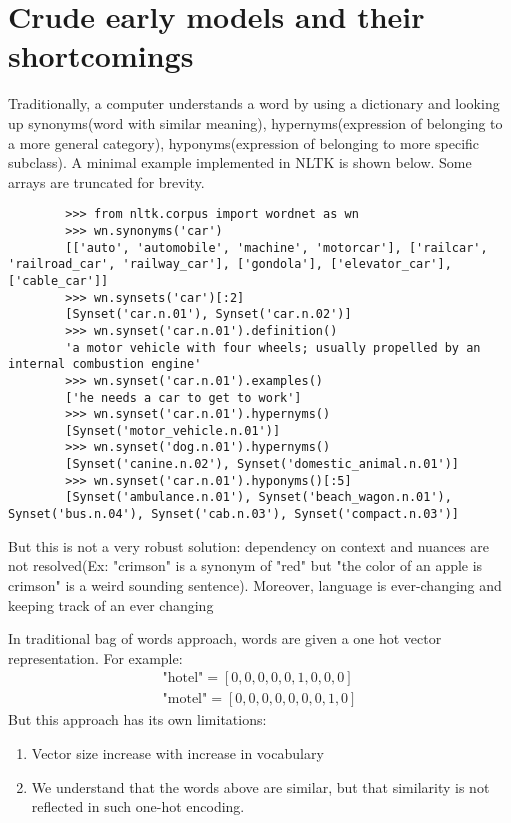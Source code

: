 \section{Crude early models and their shortcomings}

 Traditionally, a computer understands a word by using a dictionary and looking up synonyms(word with similar meaning), hypernyms(expression of belonging to a more general category), hyponyms(expression of belonging to more specific subclass). A minimal example implemented in NLTK is shown below. Some arrays are truncated for brevity.
    \begin{lstlisting}
        >>> from nltk.corpus import wordnet as wn
        >>> wn.synonyms('car')
        [['auto', 'automobile', 'machine', 'motorcar'], ['railcar', 'railroad_car', 'railway_car'], ['gondola'], ['elevator_car'], ['cable_car']]
        >>> wn.synsets('car')[:2]
        [Synset('car.n.01'), Synset('car.n.02')]
        >>> wn.synset('car.n.01').definition()
        'a motor vehicle with four wheels; usually propelled by an internal combustion engine'
        >>> wn.synset('car.n.01').examples()
        ['he needs a car to get to work']
        >>> wn.synset('car.n.01').hypernyms()
        [Synset('motor_vehicle.n.01')]
        >>> wn.synset('dog.n.01').hypernyms()    
        [Synset('canine.n.02'), Synset('domestic_animal.n.01')]
        >>> wn.synset('car.n.01').hyponyms()[:5]
        [Synset('ambulance.n.01'), Synset('beach_wagon.n.01'), Synset('bus.n.04'), Synset('cab.n.03'), Synset('compact.n.03')]
    \end{lstlisting}
But this is not a very robust solution: dependency on context and nuances are not resolved(Ex: "crimson" is a synonym of "red" but "the color of an apple is crimson" is a weird sounding sentence).  Moreover, language is ever-changing and keeping track of an ever changing 
    \begin{marginfigure}%
        
    \end{marginfigure}%
In traditional bag of words approach, words are given a one hot vector representation. For example:
\begin{align*}
    \text{"hotel"}=[0,0,0,0,0,1,0,0,0]\\
    \text{"motel"}=[0,0,0,0,0,0,0,1,0]
\end{align*}
But this approach has its own limitations:
\begin{enumerate}
    \item Vector size increase with increase in vocabulary
    \item We understand that the words above are similar, but that similarity is not reflected in such one-hot encoding.
\end{enumerate}




